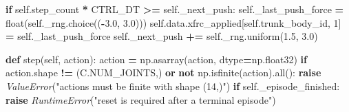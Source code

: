 \documentclass[
  american,
  11pt,
  letterpaper,
]{article}
\newenvironment{Shaded}{\begin{snugshade}}{\end{snugshade}}
\newcommand{\BuiltInTok}[1]{#1}
\newcommand{\ControlFlowTok}[1]{\textcolor[rgb]{0.13,0.29,0.53}{\textbf{#1}}}
\newcommand{\DecValTok}[1]{\textcolor[rgb]{0.00,0.00,0.81}{#1}}
\newcommand{\FloatTok}[1]{\textcolor[rgb]{0.00,0.00,0.81}{#1}}
\newcommand{\KeywordTok}[1]{\textcolor[rgb]{0.13,0.29,0.53}{\textbf{#1}}}
\newcommand{\NormalTok}[1]{#1}
\newcommand{\OperatorTok}[1]{\textcolor[rgb]{0.81,0.36,0.00}{\textbf{#1}}}
\newcommand{\PreprocessorTok}[1]{\textcolor[rgb]{0.56,0.35,0.01}{\textit{#1}}}
\newcommand{\StringTok}[1]{\textcolor[rgb]{0.31,0.60,0.02}{#1}}
\newcommand{\VariableTok}[1]{\textcolor[rgb]{0.00,0.00,0.00}{#1}}
\renewenvironment{Shaded}{\par\smallskip}{\par\smallskip}
\begin{document}
\begin{Shaded}
\begin{Highlighting}[]
        \ControlFlowTok{if} \VariableTok{self}\NormalTok{.step\_count }\OperatorTok{*}\NormalTok{ CTRL\_DT }\OperatorTok{\textgreater{}=} \VariableTok{self}\NormalTok{.\_next\_push:}
            \VariableTok{self}\NormalTok{.\_last\_push\_force }\OperatorTok{=} \BuiltInTok{float}\NormalTok{(}\VariableTok{self}\NormalTok{.\_rng.choice((}\OperatorTok{{-}}\FloatTok{3.0}\NormalTok{, }\FloatTok{3.0}\NormalTok{)))}
            \VariableTok{self}\NormalTok{.data.xfrc\_applied[}\VariableTok{self}\NormalTok{.trunk\_body\_id, }\DecValTok{1}\NormalTok{] }\OperatorTok{=} \VariableTok{self}\NormalTok{.\_last\_push\_force}
            \VariableTok{self}\NormalTok{.\_next\_push }\OperatorTok{+=} \VariableTok{self}\NormalTok{.\_rng.uniform(}\FloatTok{1.5}\NormalTok{, }\FloatTok{3.0}\NormalTok{)}

    \KeywordTok{def}\NormalTok{ step(}\VariableTok{self}\NormalTok{, action):}
\NormalTok{        action }\OperatorTok{=}\NormalTok{ np.asarray(action, dtype}\OperatorTok{=}\NormalTok{np.float32)}
        \ControlFlowTok{if}\NormalTok{ action.shape }\OperatorTok{!=}\NormalTok{ (C.NUM\_JOINTS,) }\KeywordTok{or} \KeywordTok{not}\NormalTok{ np.isfinite(action).}\BuiltInTok{all}\NormalTok{():}
            \ControlFlowTok{raise} \PreprocessorTok{ValueError}\NormalTok{(}\StringTok{"actions must be finite with shape (14,)"}\NormalTok{)}
        \ControlFlowTok{if} \VariableTok{self}\NormalTok{.\_episode\_finished:}
            \ControlFlowTok{raise} \PreprocessorTok{RuntimeError}\NormalTok{(}\StringTok{"reset is required after a terminal episode"}\NormalTok{)}


\end{Highlighting}
\end{Shaded}
\end{document}
